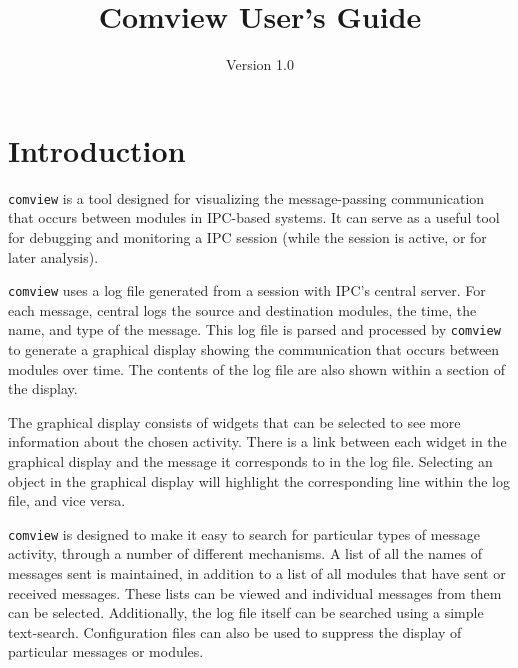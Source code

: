 


\newcommand{\comview}{{\tt comview}}

\newcommand{\system}{IPC}



\title{Comview User's Guide}
\author{Version 1.0}
\maketitle

\tableofcontents

\section{Introduction}

\comview{} is a tool designed for visualizing the message-passing communication
that occurs between modules in \system{}-based systems. It can serve as a
useful tool for debugging and monitoring a \system{} session (while the
session is active, or for later analysis).

\comview{} uses a log file generated from a session with \system{}'s central
server. For each message, central logs the source and destination
modules, the time, the name, and type of the message. This log file is
parsed and processed by \comview{} to generate a graphical display
showing the communication that occurs between modules over time. The contents of
the log file are also shown within a section of the display.

The graphical display consists of widgets that can be selected to see
more information about the chosen activity. There is a link between
each widget in the graphical display and the message it corresponds to
in the log file. Selecting an object in the graphical display will
highlight the corresponding line within the log file, and vice versa.

\comview{} is designed to make it easy to search for particular types of
message activity, through a number of different mechanisms. A list of all
the names of messages sent is maintained, in addition to a list of all
modules that have sent or received messages. These lists can be viewed
and individual messages from them can be selected. Additionally, the log file
itself can be searched using a simple text-search. Configuration files
can also be used to suppress the display of particular messages or
modules.

